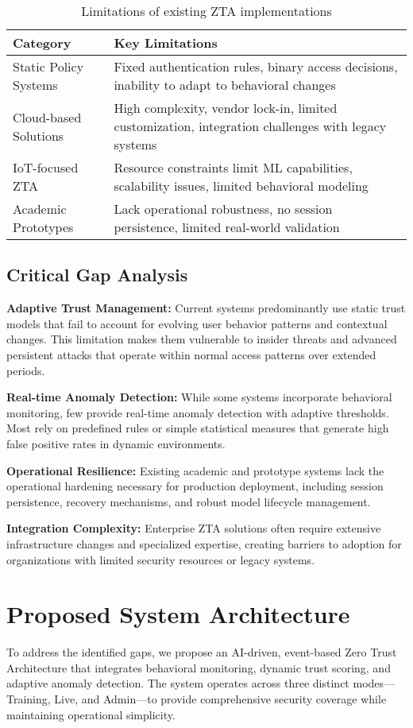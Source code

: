 \documentclass[conference]{IEEEtran}
\begin{document}
\begin{table}[t]
\centering
\caption{Limitations of existing ZTA implementations}
\begin{tabular}{@{}lp{6cm}@{}}
\toprule
\textbf{Category} & \textbf{Key Limitations} \\
\midrule
Static Policy Systems & Fixed authentication rules, binary access decisions, inability to adapt to behavioral changes \\
Cloud-based Solutions & High complexity, vendor lock-in, limited customization, integration challenges with legacy systems \\
IoT-focused ZTA & Resource constraints limit ML capabilities, scalability issues, limited behavioral modeling \\
Academic Prototypes & Lack operational robustness, no session persistence, limited real-world validation \\
\bottomrule
\end{tabular}
\label{tab:existing_gaps}
\end{table}

\subsection{Critical Gap Analysis}
\textbf{Adaptive Trust Management:} Current systems predominantly use static trust models that fail to account for evolving user behavior patterns and contextual changes. This limitation makes them vulnerable to insider threats and advanced persistent attacks that operate within normal access patterns over extended periods.

\textbf{Real-time Anomaly Detection:} While some systems incorporate behavioral monitoring, few provide real-time anomaly detection with adaptive thresholds. Most rely on predefined rules or simple statistical measures that generate high false positive rates in dynamic environments.

\textbf{Operational Resilience:} Existing academic and prototype systems lack the operational hardening necessary for production deployment, including session persistence, recovery mechanisms, and robust model lifecycle management.

\textbf{Integration Complexity:} Enterprise ZTA solutions often require extensive infrastructure changes and specialized expertise, creating barriers to adoption for organizations with limited security resources or legacy systems.

\section{Proposed System Architecture}
To address the identified gaps, we propose an AI-driven, event-based Zero Trust Architecture that integrates behavioral monitoring, dynamic trust scoring, and adaptive anomaly detection. The system operates across three distinct modes—Training, Live, and Admin—to provide comprehensive security coverage while maintaining operational simplicity.
\end{document}
